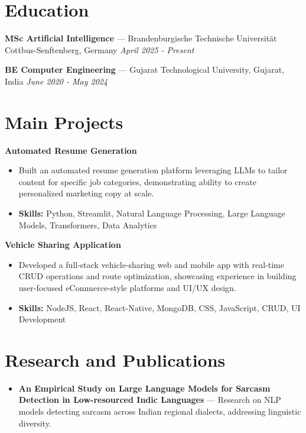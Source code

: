 \documentclass[a4paper,10pt]{article}
\begin{document}
\section*{Education}
\textbf{MSc Artificial Intelligence} — Brandenburgische Technische Universität Cottbus-Senftenberg, Germany \hfill \textit{April 2025 - Present}\par
\vspace{1.5pt}
\textbf{BE Computer Engineering} — Gujarat Technological University, Gujarat, India \hfill \textit{June 2020 - May 2024}\par

\section*{Main Projects}
\textbf{Automated Resume Generation}\par
\vspace{1pt}
\begin{itemize}
  \item Built an automated resume generation platform leveraging LLMs to tailor content for specific job categories, demonstrating ability to create personalized marketing copy at scale.
  \item \textbf{Skills:} Python, Streamlit, Natural Language Processing, Large Language Models, Transformers, Data Analytics
\end{itemize}
\vspace{3pt}
\textbf{Vehicle Sharing Application}\par
\vspace{1pt}
\begin{itemize}
  \item Developed a full-stack vehicle-sharing web and mobile app with real-time CRUD operations and route optimization, showcasing experience in building user-focused eCommerce-style platforms and UI/UX design.
  \item \textbf{Skills:} NodeJS, React, React-Native, MongoDB, CSS, JavaScript, CRUD, UI Development
\end{itemize}

\section*{Research and Publications}
\begin{itemize}
\item \textbf{An Empirical Study on Large Language Models for Sarcasm Detection in Low-resourced Indic Languages} — Research on NLP models detecting sarcasm across Indian regional dialects, addressing linguistic diversity.
\end{itemize}
\end{document}
